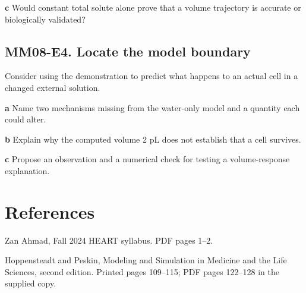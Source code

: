 \documentclass[11pt,letterpaper]{article}
\theoremstyle{definition}\newtheorem{definition}{Definition}\newtheorem{example}{Example}
\numberwithin{equation}{section}
\begin{document}
\textbf{c} Would constant total solute alone prove that a volume trajectory is accurate or biologically validated?

\par\noindent\begin{minipage}{\linewidth}
\subsection*{MM08-E4. Locate the model boundary}
Consider using the demonstration to predict what happens to an actual cell in a changed external solution.

\textbf{a} Name two mechanisms missing from the water-only model and a quantity each could alter.

\end{minipage}\par\medskip
\textbf{b} Explain why the computed volume 2 pL does not establish that a cell survives.

\textbf{c} Propose an observation and a numerical check for testing a volume-response explanation.

\section*{References}
\noindent\begin{minipage}{\linewidth}
Zan Ahmad, Fall 2024 HEART syllabus. PDF pages 1--2.

\end{minipage}\par\medskip
\noindent\begin{minipage}{\linewidth}
Hoppensteadt and Peskin, Modeling and Simulation in Medicine and the Life Sciences, second edition. Printed pages 109--115; PDF pages 122--128 in the supplied copy.

\end{minipage}\par\medskip
\end{document}
